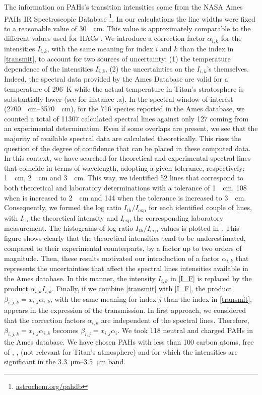 \documentclass{arxiv-icarus}
\begin{document}
The information on PAHs's transition intensities come from the NASA Ames PAHs IR Spectroscopic Database \footnote{\href{http://www.astrochem.org/pahdb/}{astrochem.org/pahdb}}.
In our calculations the line widths were fixed to a reasonable value of \SI{30}{\per\cm}. This value is approximately comparable to the different values used for HACs \citep{Dartois2007}.
We introduce a correction factor $\alpha_{i,k}$ for the intensities $I_{i,k}$, with the same meaning for index $i$ and $k$ than the index in \eqref{transmit}, to account for two sources of uncertainty:
(1) the temperature dependence of the intensities $I_{i,k}$,
(2) the uncertainties on the $I_{i,k}$'s themselves.
Indeed, the spectral data provided by the Ames Database are valid for a temperature of \SI{296}{K} while the actual temperature in Titan's stratosphere is substantially lower (see for instance .a). In the spectral window of interest (\ie \SIrange{2700}{3570}{\per\cm}), for the 716 species reported in the Ames database, we counted a total of \num{11307} calculated spectral lines against only 127 coming from an experimental determination. Even if some overlaps are present, we see that the majority of available spectral data are calculated theoretically.
This rises the question of the degree of confidence that can be placed in these computed data. In this context, we have searched for theoretical and experimental spectral lines that coincide in terms of wavelength, adopting a given tolerance, respectively: \SI{1}{\per\cm}, \SI{2}{\per\cm} and \SI{3}{\per\cm}.
This way, we identified 52 lines that correspond to both theoretical and laboratory determinations with a tolerance of \SI{1}{\per\cm}, 108 when is increased to \SI{2}{\per\cm} and 144 when the tolerance is increased to \SI{3}{\per\cm}.
Consequently, we formed the log ratio $I_\text{th} / I_\text{exp}$ for each identified couple of lines, with $I_\text{th}$ the theoretical intensity and $I_\text{exp}$ the corresponding laboratory measurement.
The histograms of log ratio $I_\text{th} / I_\text{exp}$ values is plotted in .
This figure shows clearly that the theoretical intensities tend to be underestimated, compared to their experimental counterparts, by a factor up to two orders of magnitude. Then, these results motivated our introduction of a factor $\alpha_{i,k}$ that represents the uncertainties that affect the spectral lines intensities available in the Ames database. In this manner, the intensity $I_{i,k}$ in \eqref{I_F} is replaced by the product $\alpha_{i,k} I_{i,k}$. Finally, if we combine \eqref{transmit} with \eqref{I_F}, the product $\beta_{i,j,k} = x_{i,j} \alpha_{i,k}$, with the same meaning for index $j$ than the index in \eqref{transmit}, appears in the expression of the transmission.
In first approach, we considered that the correction factors $\alpha_{i,k}$ are independent of the spectral lines. Therefore, $\beta_{i,j,k} = x_{i,j} \alpha_{i,k}$ becomes $\beta_{i,j} = x_{i,j} \alpha_i$.
We took 118 neutral and charged PAHs in the Ames database. We have chosen PAHs with less than 100 carbon atoms, free of , ,  (not relevant for Titan's atmosphere) and for which the intensities are significant in the \SIrange{3.3}{3.5}{\um} band.
\end{document}
